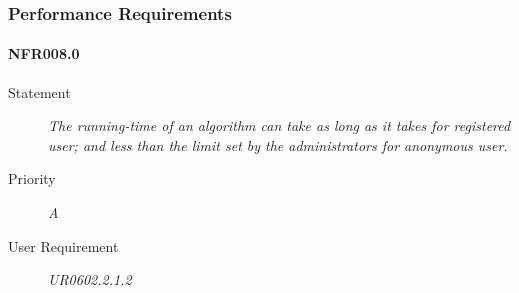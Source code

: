 \subsubsection{Performance Requirements}

\paragraph{NFR008.0}
\begin{description}
\item[Statement] \textit{
The running-time of an algorithm can take as long as it takes for registered user; and less than the limit set by the administrators for anonymous user.
}
\item[Priority] \textit{A}
\item[User Requirement] \textit{UR0602.2.1.2}
\end{description}
